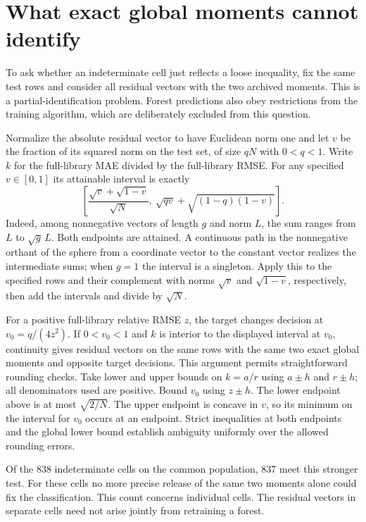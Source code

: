 \section{What exact global moments cannot identify}
To ask whether an indeterminate cell just reflects a loose inequality, fix the same test rows and consider all residual vectors with the two archived moments. This is a partial-identification problem. Forest predictions also obey restrictions from the training algorithm, which are deliberately excluded from this question.

Normalize the absolute residual vector to have Euclidean norm one and let $v$ be the fraction of its squared norm on the test set, of size $qN$ with $0<q<1$. Write $k$ for the full-library MAE divided by the full-library RMSE. For any specified $v\in[0,1]$ its attainable interval is exactly
\[
\left[\frac{\sqrt v+\sqrt{1-v}}{\sqrt N},\
       \sqrt{qv}+\sqrt{(1-q)(1-v)}\right].
\]
Indeed, among nonnegative vectors of length $g$ and norm $L$, the sum ranges from $L$ to $\sqrt g\,L$. Both endpoints are attained. A continuous path in the nonnegative orthant of the sphere from a coordinate vector to the constant vector realizes the intermediate sums; when $g=1$ the interval is a singleton. Apply this to the specified rows and their complement with norms $\sqrt v$ and $\sqrt{1-v}$, respectively, then add the intervals and divide by $\sqrt N$.

For a positive full-library relative RMSE $z$, the target changes decision at $v_0=q/(4z^2)$. If $0<v_0<1$ and $k$ is interior to the displayed interval at $v_0$, continuity gives residual vectors on the same rows with the same two exact global moments and opposite target decisions. This argument permits straightforward rounding checks. Take lower and upper bounds on $k=a/r$ using $a\pm h$ and $r\pm h$; all denominators used are positive. Bound $v_0$ using $z\pm h$. The lower endpoint above is at most $\sqrt{2/N}$. The upper endpoint is concave in $v$, so its minimum on the interval for $v_0$ occurs at an endpoint. Strict inequalities at both endpoints and the global lower bound establish ambiguity uniformly over the allowed rounding errors.

Of the 838 indeterminate cells on the common population, 837 meet this stronger test. For these cells no more precise release of the same two moments alone could fix the classification. This count concerns individual cells. The residual vectors in separate cells need not arise jointly from retraining a forest.

